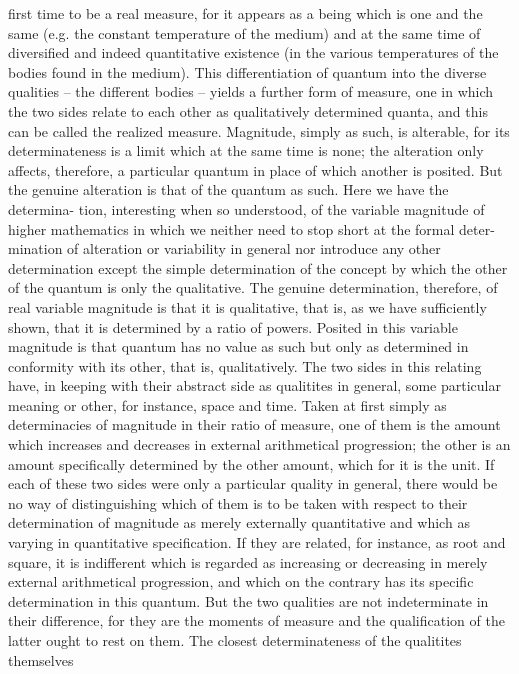 first time to be a real measure, for it appears as a being which is one and the
same (e.g. the constant temperature of the medium) and at the same time of
diversified and indeed quantitative existence (in the various temperatures of
the bodies found in the medium). This differentiation of quantum into the
diverse qualities – the different bodies – yields a further form of measure,
one in which the two sides relate to each other as qualitatively determined
quanta, and this can be called the realized measure.
Magnitude, simply as such, is alterable, for its determinateness is a limit
which at the same time is none; the alteration only affects, therefore, a
particular quantum in place of which another is posited. But the genuine
alteration is that of the quantum as such. Here we have the determina-
tion, interesting when so understood, of the variable magnitude of higher
mathematics in which we neither need to stop short at the formal deter-
mination of alteration or variability in general nor introduce any other
determination except the simple determination of the concept by which
the other of the quantum is only the qualitative. The genuine determination,
therefore, of real variable magnitude is that it is qualitative, that is, as we
have sufficiently shown, that it is determined by a ratio of powers. Posited
in this variable magnitude is that quantum has no value as such but only
as determined in conformity with its other, that is, qualitatively.
The two sides in this relating have, in keeping with their abstract side as
qualitites in general, some particular meaning or other, for instance, space
and time. Taken at first simply as determinacies of magnitude in their
ratio of measure, one of them is the amount which increases and decreases
in external arithmetical progression; the other is an amount specifically
determined by the other amount, which for it is the unit. If each of these
two sides were only a particular quality in general, there would be no
way of distinguishing which of them is to be taken with respect to their
determination of magnitude as merely externally quantitative and which as
varying in quantitative specification. If they are related, for instance, as root
and square, it is indifferent which is regarded as increasing or decreasing
in merely external arithmetical progression, and which on the contrary has
its specific determination in this quantum.
But the two qualities are not indeterminate in their difference, for they
are the moments of measure and the qualification of the latter ought to
rest on them. The closest determinateness of the qualitites themselves
